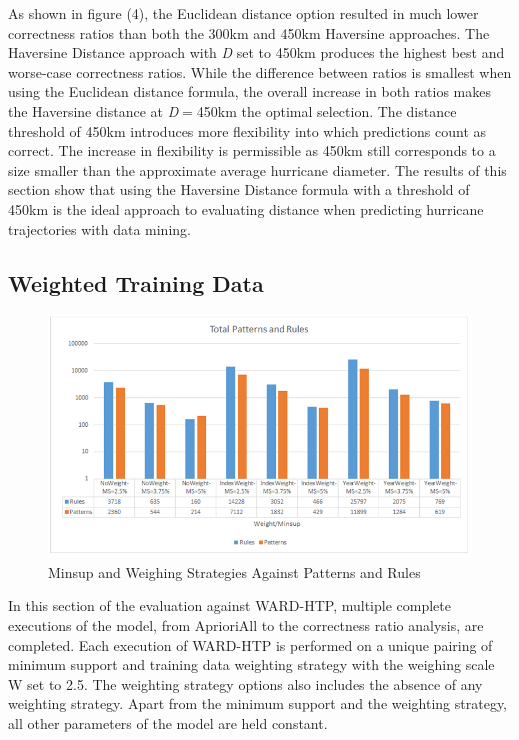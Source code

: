 \documentclass[12pt,conference]{IEEEtran}
\begin{document}
As shown in figure (4), the Euclidean distance option resulted in much lower correctness ratios than both the 300km and 450km Haversine approaches. The Haversine Distance approach with \textit{D} set to 450km produces the highest best and worse-case correctness ratios. While the difference between ratios is smallest when using the Euclidean distance formula, the overall increase in both ratios makes the Haversine distance at \textit{D}$=$450km the optimal selection. The distance threshold of 450km introduces more flexibility into which predictions count as correct. The increase in flexibility is permissible as 450km still corresponds to a size smaller than the approximate average hurricane diameter. The results of this section show that using the Haversine Distance formula with a threshold of 450km is the ideal approach to evaluating distance when predicting hurricane trajectories with data mining.

\subsection{Weighted Training Data}

\begin{figure}[!bp]
\centering
\includegraphics[scale=0.8]{Patterns-Rules-Weight-Metrics}
\caption{Minsup and Weighing Strategies Against Patterns and Rules}
\end{figure}

In this section of the evaluation against WARD-HTP, multiple complete executions of the model, from AprioriAll to the correctness ratio analysis, are completed. Each execution of WARD-HTP is performed on a unique pairing of minimum support and training data weighting strategy with the weighing scale W set to 2.5. The weighting strategy options also includes the absence of any weighting strategy. Apart from the minimum support and the weighting strategy, all other parameters of the model are held constant.
\end{document}
